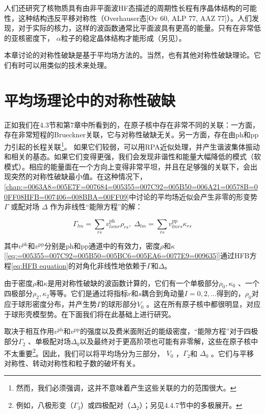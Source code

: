 人们还研究了核物质具有由非平面波HF态描述的周期性长程有序晶体结构的可能性，这种结构违反平移对称性（Overhauser态{[}Ov
60, ALP 77, AAZ 77{]}）。人们发现，对于实际的核力，这样的波函数通常比平面波具有更高的能量。只有在非常低的亚核密度下，
$\alpha$粒子的稳定晶体结构才能形成（另见\cite{BC73}）。

本章讨论的对称性破缺是基于平均场方法的。当然，也有其他对称性破缺理论。它们有时可以用类似的技术来处理。

\section{平均场理论中的对称性破缺\label{sec:=005E73=005747=00573A=007406=008BBA=004E2D=007684=005BF9=0079F0=006027=007834=007F3A}}

正如我们在4.3节和第7章中所看到的，在原子核中存在非常不同的关联：一方面，存在非常短程的Brueckner关联，它与对称性破缺无关。另一方面，存在由ph和pp力引起的长程关联\footnote{然而，我们必须强调，这并不意味着产生这些关联的力的范围很大。}。
如果它们较弱，可以用RPA近似处理，并产生谐波集体振动和相关的基态。如果它们变得更强，我们会发现非谐性和能量大幅降低的模式（软模式）。相应的能量面在一个方向上变得非常平坦，并且在足够强的关联下，会出现突然的对称性破缺最小值。在这种情况下，\ref{chap:=0063A8=005E7F=007684=005355=007C92=005B50=006A21=00578B=00FF08HFB=007406=008BBA=00FF09}中讨论的平均场近似会产生非零的形变势
$\Gamma$ 或配对场 $\Delta$ 作为非线性“能隙方程”的解：

\[
\Gamma_{lm}=\sum_{rs}v^{\text{ph}}_{lsmr}\rho_{rs},\;\Delta_{lm}=\sum_{rs}v^{\text{pp}}_{lmrs}\kappa_{rs}\tag{11.2}
\]

其中$v^{\text{ph}}$和$v^{\text{pp}}$分别是ph和pp通道中的有效力，密度$\rho$和$\kappa${[}\ref{eq:=005355=007C92=005B50=005BC6=005EA6=0077E9=009635}{]}通过HFB方程\ref{eq:HFB equation}的对角化非线性地依赖于$\Gamma$和$\Delta$。

由于密度$\rho$和$\kappa$是用对称性破缺的波函数计算的，它们有一个单极部分$\rho_{0},\kappa_{0}$
、一个四极部分$\rho_{2},\kappa_{2}$等等。它们是通过将指标$r$和$s$耦合到角动量$I=0,2,\ldots$得到的，$\rho_{0}$对应于球形密度分布，并产生势$\Gamma$的球形部分$V_{0}$
。这在所有原子核中都很明显，对应于球形壳模型势。在下面我们将在此基础上进行研究。

取决于相互作用$v^{\text{ph}}$和$v^{\text{pp}}$的强度以及费米面附近的能级密度，“能隙方程”对于四极部分$\Gamma_{2}$
、单极配对场$\Delta_{0}$以及最终对于更高阶项也可能有非零解，这些在原子核中不太重要\footnote{例如，八极形变（$\Gamma_{3}$）或四极配对（$\Delta_{2}$）；另见4.4.7节中的多极展开。}。因此，我们可以将平均场分为三部分，
$V_{0}$ ，$\Gamma_{2}$和 $\Delta_{0}$ 。它们与平移对称性、转动对称性和粒子数的破坏有关。

